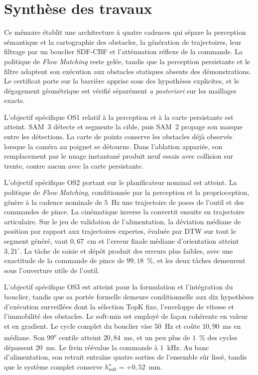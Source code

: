 \label{sec:Conclusion}

\section{Synthèse des travaux}\label{sec:Synthese}

Ce mémoire établit une architecture à quatre cadences qui sépare la perception sémantique et la cartographie des obstacles, la génération de trajectoires, leur filtrage par un bouclier \acs{SDF}-\acs{CBF} et l'atténuation réflexe de la commande. La politique de \textit{Flow Matching} reste gelée, tandis que la perception persistante et le filtre adaptent son exécution aux obstacles statiques absents des démonstrations. Le certificat porte sur la barrière apprise sous des hypothèses explicites, et le dégagement géométrique est vérifié séparément \textit{a posteriori} sur les maillages exacts.

L'objectif spécifique \acs{OS}1 relatif à la perception et à la carte persistante est atteint. \ac{SAM}~3 détecte et segmente la cible, puis \ac{SAM}~2 propage son masque entre les détections. La carte de points conserve les obstacles déjà observés lorsque la caméra au poignet se détourne. Dans l'ablation appariée, son remplacement par le nuage instantané produit neuf essais avec collision sur trente, contre aucun avec la carte persistante.

L'objectif spécifique \acs{OS}2 portant sur le planificateur nominal est atteint. La politique de \textit{Flow Matching}, conditionnée par la perception et la proprioception, génère à la cadence nominale de $5$~Hz une trajectoire de poses de l'outil et des commandes de pince. La cinématique inverse la convertit ensuite en trajectoire articulaire. Sur le jeu de validation de l'alimentation, la déviation médiane de position par rapport aux trajectoires expertes, évaluée par \ac{DTW} sur tout le segment généré, vaut $0{,}67$~cm et l'erreur finale médiane d'orientation atteint $3{,}21^\circ$. La tâche de saisie et dépôt produit des erreurs plus faibles, avec une exactitude de la commande de pince de $99{,}18$~\%, et les deux tâches demeurent sous l'ouverture utile de l'outil.

L'objectif spécifique \acs{OS}3 est atteint pour la formulation et l'intégration du bouclier, tandis que sa portée formelle demeure conditionnelle aux dix hypothèses d'exécution surveillées dont la sélection TopK fixe, l'enveloppe de vitesse et l'immobilité des obstacles. Le soft-min est employé de façon cohérente en valeur et en gradient. Le cycle complet du bouclier vise $50$~Hz et coûte $10{,}90$~ms en médiane. Son 99\textsuperscript{e} centile atteint $20{,}84$~ms, et un peu plus de $1$~\% des cycles dépassent $20$~ms. Le frein réévalue la commande à $1$~kHz. Au banc d'alimentation, son retrait entraîne quatre sorties de l'ensemble sûr lissé, tandis que le système complet conserve $h_{\mathrm{soft}}^{\star}=+0{,}52$~mm.

